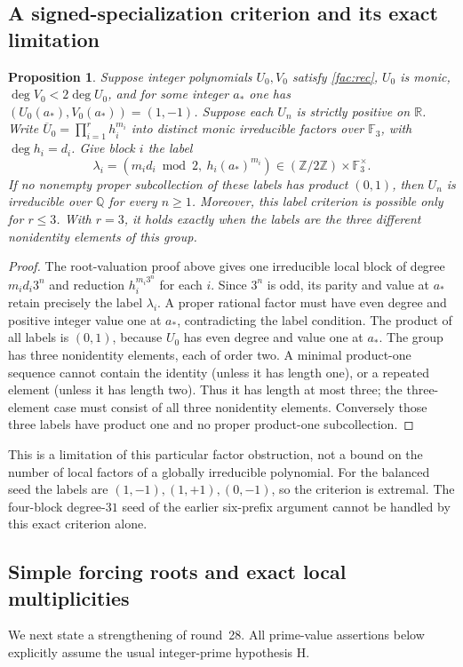 \documentclass[11pt,a4paper]{article}
\newtheorem{proposition}[theorem]{Proposition}
\theoremstyle{remark}\newtheorem{remark}[theorem]{Remark}
\begin{document}
\subsection{A signed-specialization criterion and its exact limitation}
\begin{proposition}\label{fac:signcriterion}
Suppose integer polynomials $U_0,V_0$ satisfy \eqref{fac:rec}, $U_0$ is
monic, $\deg V_0<2\deg U_0$, and for some integer $a_*$ one has
$(U_0(a_*),V_0(a_*))=(1,-1)$. Suppose each $U_n$ is strictly positive
on $\mathbb R$. Write
$\overline U_0=\prod_{i=1}^r h_i^{m_i}$ into distinct monic irreducible
factors over $\mathbb F_3$, with $\deg h_i=d_i$. Give block $i$ the label
\[
 \lambda_i=(m_id_i\bmod2,\ h_i(a_*)^{m_i})
 \in(\mathbb Z/2\mathbb Z)\times\mathbb F_3^\times.
\]
If no nonempty proper subcollection of these labels has product
$(0,1)$, then $U_n$ is irreducible over $\mathbb Q$ for every $n\ge1$.
Moreover, this label criterion is possible only for $r\le3$. With
$r=3$, it holds exactly when the labels are the three different
nonidentity elements of this group.
\end{proposition}
\begin{proof}
The root-valuation proof above gives one irreducible local block of
degree $m_id_i3^n$ and reduction $h_i^{m_i3^n}$ for each $i$.
Since $3^n$ is odd, its parity and value at $a_*$ retain precisely the
label $\lambda_i$. A proper rational factor must have even degree and
positive integer value one at $a_*$, contradicting the label condition.
The product of all labels is $(0,1)$, because $U_0$ has even degree
and value one at $a_*$. The group has three nonidentity elements,
each of order two. A minimal product-one sequence cannot contain the
identity (unless it has length one), or a repeated element (unless
it has length two). Thus it has length at most three; the three-element
case must consist of all three nonidentity elements. Conversely those
three labels have product one and no proper product-one subcollection.
\end{proof}
This is a limitation of this particular factor obstruction, not a
bound on the number of local factors of a globally irreducible polynomial.
For the balanced seed the labels are $(1,-1),(1,+1),(0,-1)$, so the
criterion is extremal. The four-block degree-$31$ seed of the earlier
six-prefix argument cannot be handled by this exact criterion alone.

\subsection{Simple forcing roots and exact local multiplicities}
We next state a strengthening of round~28. All prime-value assertions
below explicitly assume the usual integer-prime hypothesis H.
\end{document}
